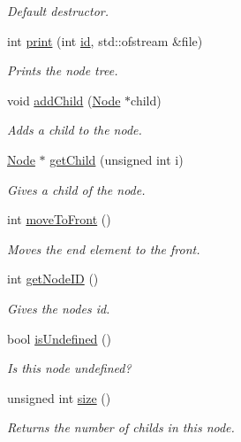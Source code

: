 \begin{DoxyCompactItemize}
\begin{DoxyCompactList}\small\item\em Default destructor. \end{DoxyCompactList}\item 
int \hyperlink{classNode_a6da281a118324b234071c80a554500cf}{print} (int \hyperlink{classNode_a59a543130a10c95f1e8642cf8c5645e8}{id}, std\+::ofstream \&file)
\begin{DoxyCompactList}\small\item\em Prints the node tree. \end{DoxyCompactList}\item 
void \hyperlink{classNode_a132699398b350e83b548a5645e69beb0}{add\+Child} (\hyperlink{classNode}{Node} $\ast$child)
\begin{DoxyCompactList}\small\item\em Adds a child to the node. \end{DoxyCompactList}\item 
\hyperlink{classNode}{Node} $\ast$ \hyperlink{classNode_a49395be2fd2be32e99c49df5bc5d2c6c}{get\+Child} (unsigned int i)
\begin{DoxyCompactList}\small\item\em Gives a child of the node. \end{DoxyCompactList}\item 
int \hyperlink{classNode_ae6c16dcf36a81a79b3b6e4adb51b229a}{move\+To\+Front} ()
\begin{DoxyCompactList}\small\item\em Moves the end element to the front. \end{DoxyCompactList}\item 
int \hyperlink{classNode_a374c18bf6d7332e4a128107b8446d1ad}{get\+Node\+I\+D} ()
\begin{DoxyCompactList}\small\item\em Gives the nodes id. \end{DoxyCompactList}\item 
bool \hyperlink{classNode_a8a8a7a2ee9cd1bdf5a3e3cc374e678e6}{is\+Undefined} ()
\begin{DoxyCompactList}\small\item\em Is this node undefined? \end{DoxyCompactList}\item 
unsigned int \hyperlink{classNode_a985e47bbe8f5fade05f7accc2475794e}{size} ()
\begin{DoxyCompactList}\small\item\em Returns the number of childs in this node. \end{DoxyCompactList}\item 

\end{DoxyCompactItemize}
